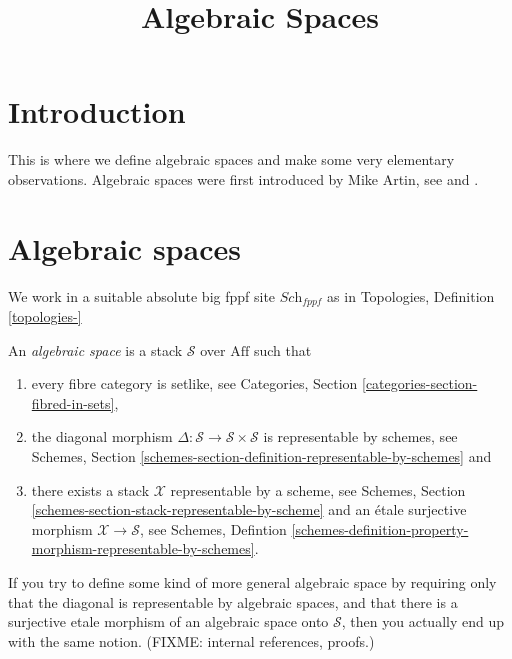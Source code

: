 

%


\title{Algebraic Spaces}


\maketitle

\tableofcontents

\section{Introduction}
\label{section-introduction}

\noindent
This is where we define algebraic spaces and make some very elementary
observations. Algebraic spaces were first introduced by Mike Artin,
see \cite{ArtinI} and \cite{ArtinII}.

\section{Algebraic spaces}
\label{section-algebraic-spaces}

\noindent
We work in a suitable absolute big fppf site $\textit{Sch}_{fppf}$
as in Topologies, Definition \ref{topologies-}

\begin{definition}
\label{definition-algebraic-space}
An {\it algebraic space} is a stack $\mathcal{S}$ over $\text{Aff}$ such that
\begin{enumerate}
\item every fibre category is setlike, see Categories,
Section \ref{categories-section-fibred-in-sets}, 
\item the diagonal morphism
$\Delta : \mathcal{S} \to \mathcal{S}\times\mathcal{S}$
is representable by schemes, see Schemes, Section
\ref{schemes-section-definition-representable-by-schemes} and
\item there exists a stack $\mathcal{X}$ representable by a scheme, see
Schemes, Section \ref{schemes-section-stack-representable-by-scheme}
and an \'etale surjective morphism $\mathcal{X} \to \mathcal{S}$,
see Schemes, Defintion
\ref{schemes-definition-property-morphism-representable-by-schemes}.
\end{enumerate}
\end{definition}

\begin{remark}
\label{remark-definition-correct}
If you try to define some kind of more general algebraic space by requiring
only that the diagonal is representable by algebraic spaces, and that there is
a surjective etale morphism of an algebraic space onto $\mathcal{S}$, then 
you actually end up with the same notion.
(FIXME: internal references, proofs.)
\end{remark}


